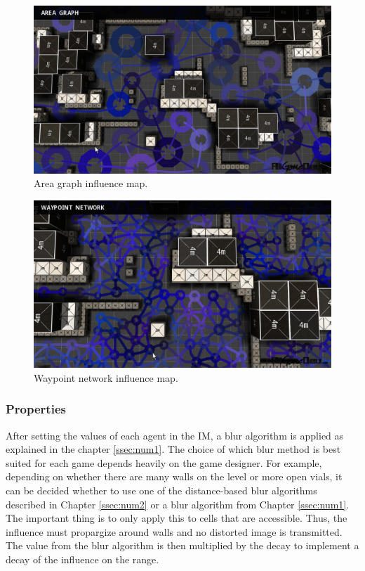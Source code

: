 \documentclass[]{report}
\begin{document}
	\begin{figure}[h!]
		\centering
		\includegraphics[width=1\linewidth]{Images/screenshot001_aregraph1}
		\caption[Area graph influence map.]{Area graph influence map. \citep{gameDevInfluenceMap} \citep{imPathfinding}}
		\label{fig:screenshot001aregraph1}
	\end{figure}
	
	\begin{figure}[h!]
		\centering
		\includegraphics[width=1\linewidth]{Images/screenshot001_aregraph2}
		\caption[Waypoint network influence map.]{Waypoint network influence map. \citep{gameDevInfluenceMap} \citep{imPathfinding}}
		\label{fig:screenshot001aregraph2}
	\end{figure}
	
	\newpage
	\subsubsection{Properties}
	After setting the values of each agent in the IM, a blur algorithm is applied as explained in the chapter \ref{ssec:num1}. The choice of which blur method is best suited for each game depends heavily on the game designer. For example, depending on whether there are many walls on the level or more open vials, it can be decided whether to use one of the distance-based blur algorithms described in Chapter \ref{ssec:num2} or a blur algorithm from Chapter \ref{ssec:num1}. The important thing is to only apply this to cells that are accessible. Thus, the influence must propargize around walls and no distorted image is transmitted. The value from the blur algorithm is then multiplied by the decay to implement a decay of the influence on the range. 
	
\end{document}
